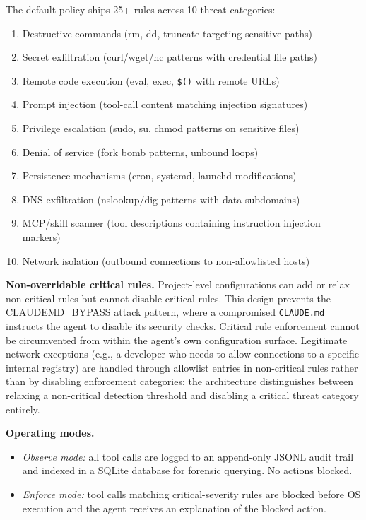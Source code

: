 \documentclass[11pt,letterpaper]{article}
\begin{document}
The default policy ships 25+
rules across 10 threat categories:
\begin{enumerate}[noitemsep,topsep=2pt,label=(\arabic*)]
  \item Destructive commands (rm, dd, truncate targeting sensitive paths)
  \item Secret exfiltration (curl/wget/nc patterns with credential file paths)
  \item Remote code execution (eval, exec, \texttt{\$()} with remote URLs)
  \item Prompt injection (tool-call content matching injection signatures)
  \item Privilege escalation (sudo, su, chmod patterns on sensitive files)
  \item Denial of service (fork bomb patterns, unbound loops)
  \item Persistence mechanisms (cron, systemd, launchd modifications)
  \item DNS exfiltration (nslookup/dig patterns with data subdomains)
  \item MCP/skill scanner (tool descriptions containing instruction injection markers)
  \item Network isolation (outbound connections to non-allowlisted hosts)
\end{enumerate}

\textbf{Non-overridable critical rules.} Project-level configurations can add or relax
non-critical rules but cannot disable critical rules. This design prevents the
CLAUDEMD\_BYPASS attack pattern, where a compromised \texttt{CLAUDE.md} instructs the
agent to disable its security checks. Critical rule enforcement cannot be circumvented
from within the agent's own configuration surface. Legitimate network exceptions (e.g.,
a developer who needs to allow connections to a specific internal registry) are handled
through allowlist entries in non-critical rules rather than by disabling enforcement
categories: the architecture distinguishes between relaxing a non-critical detection
threshold and disabling a critical threat category entirely.

\textbf{Operating modes.}
\begin{itemize}[noitemsep,topsep=2pt]
  \item \emph{Observe mode:} all tool calls are logged to an append-only JSONL audit
        trail and indexed in a SQLite database for forensic querying. No actions blocked.
  \item \emph{Enforce mode:} tool calls matching critical-severity rules are blocked
        before OS execution and the agent receives an explanation of the blocked action.
\end{itemize}
\end{document}
